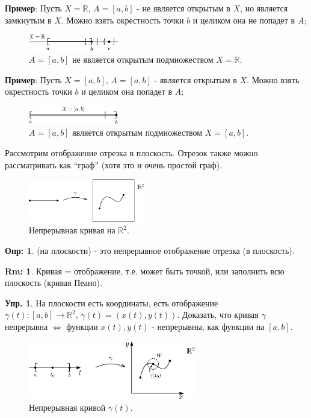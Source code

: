 \documentclass[12pt]{article}
\newcommand{\MR}{\mathbb{R}}
\theoremstyle{definition}
\newtheorem{defn}{Опр:}
\newtheorem{rem}{Rm:}
\newtheorem{exrc}{Упр.}
\begin{document}
\textbf{Пример}: Пусть $X = \MR,\, A = [a,b]$ - не является открытым в $X$, но является замкнутым в $X$. Можно взять окрестность точки $b$ и целиком она не попадет в $A$;
\begin{figure}[H]
	\centering
	\includegraphics[width=0.35\textwidth]{1_10.eps}
	\caption{$A = [a,b]$ не является открытым подмножеством $X = \MR$.}
	\label{1_10}
\end{figure}
\textbf{Пример}: Пусть $X = [a,b],\, A = [a,b]$ - является открытым в $X$. Можно взять окрестность точки $b$ и целиком она попадет в $A$;
\begin{figure}[H]
	\centering
	\includegraphics[width=0.35\textwidth]{1_11.eps}
	\caption{$A = [a,b]$ является открытым подмножеством $X = [a,b]$.}
	\label{1_11}
\end{figure}

Рассмотрим отображение отрезка в плоскость. Отрезок также можно рассматривать как ``граф'' (хотя это и очень простой граф).
\begin{figure}[H]
	\centering
	\includegraphics[width=0.45\textwidth]{1_12.eps}
	\caption{Непрерывная кривая на $\MR^2$.}
	\label{1_12}
\end{figure}
\begin{defn}
	 (на плоскости) - это непрерывное отображение отрезка (в плоскость).
\end{defn}
\begin{rem}
	Кривая = отображение, т.е. может быть точкой, или заполнить всю плоскость (кривая Пеано).
\end{rem}
\begin{exrc}
	На плоскости есть координаты, есть отображение $\gamma(t) \colon [a,b] \to \MR^2, \, \gamma(t) = (x(t), y(t))$. Доказать, что кривая $\gamma$ непрерывна $\Leftrightarrow$ функции $x(t), y(t)$ - непрерывны, как функции на $[a,b]$.
\end{exrc}
\begin{figure}[H]
	\centering
	\includegraphics[width=0.65\textwidth]{1_13.eps}
	\caption{Непрерывная кривой $\gamma(t)$.}
	\label{1_13}
\end{figure}
\end{document}
